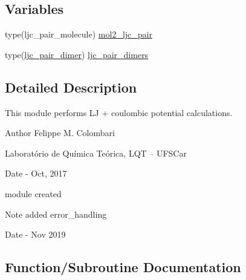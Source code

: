 \subsection*{Variables}
\begin{DoxyCompactItemize}
\item 
type(ljc\+\_\+pair\+\_\+molecule) \hyperlink{namespacemod__pot__ljc__pair_af4f6357fdd649043f9ec44f39808a9ca}{mol2\+\_\+ljc\+\_\+pair}
\item 
type(\hyperlink{structmod__pot__ljc__pair_1_1ljc__pair__dimer}{ljc\+\_\+pair\+\_\+dimer}) \hyperlink{namespacemod__pot__ljc__pair_ad0c1c41e0227ea0136e97a69257a4132}{ljc\+\_\+pair\+\_\+dimers}
\end{DoxyCompactItemize}


\subsection{Detailed Description}
This module performs LJ + coulombic potential calculations. 

\begin{DoxyAuthor}{Author}
Felippe M. Colombari
\begin{DoxyItemize}
\item Laboratório de Química Teórica, L\+QT -- U\+F\+S\+Car 
\end{DoxyItemize}
\end{DoxyAuthor}
\begin{DoxyDate}{Date}
-\/ Oct, 2017
\begin{DoxyItemize}
\item module created 
\end{DoxyItemize}
\end{DoxyDate}
\begin{DoxyNote}{Note}
added error\+\_\+handling 
\end{DoxyNote}
\begin{DoxyDate}{Date}
-\/ Nov 2019 
\end{DoxyDate}


\subsection{Function/\+Subroutine Documentation}
\mbox{\label{namespacemod__pot__ljc__pair_ae2cc8a028ca8c5488be8c934dec21f61}} 
